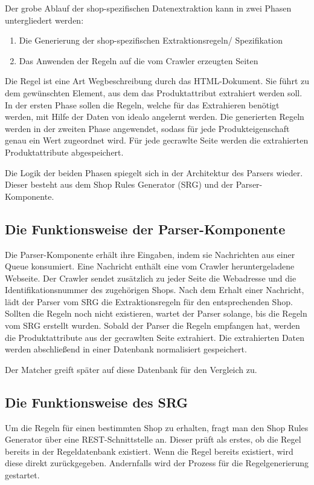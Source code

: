 Der grobe Ablauf der shop-spezifischen Datenextraktion kann in zwei Phasen untergliedert werden:
\begin{enumerate}
    \item Die Generierung der shop-spezifischen Extraktionsregeln/ Spezifikation
    \item Das Anwenden der Regeln auf die vom Crawler erzeugten Seiten
\end{enumerate}
Die Regel ist eine Art Wegbeschreibung durch das HTML-Dokument.
Sie führt zu dem gewünschten Element, aus dem das Produktattribut extrahiert werden soll.
In der ersten Phase sollen die Regeln, welche für das Extrahieren benötigt werden, mit Hilfe der Daten von idealo
angelernt werden.
Die generierten Regeln werden in der zweiten Phase angewendet, sodass für jede Produkteigenschaft genau ein Wert
zugeordnet wird.
Für jede gecrawlte Seite werden die extrahierten Produktattribute abgespeichert.

Die Logik der beiden Phasen spiegelt sich in der Architektur des Parsers wieder.
Dieser besteht aus dem Shop Rules Generator (SRG) und der Parser-Komponente.

\subsection{Die Funktionsweise der Parser-Komponente}
\label{subsec:funktionsweise-parser}

Die Parser-Komponente erhält ihre Eingaben, indem sie Nachrichten aus einer Queue konsumiert.
Eine Nachricht enthält eine vom Crawler heruntergeladene Webseite.
Der Crawler sendet zusätzlich zu jeder Seite die Webadresse und die Identifikationsnummer des zugehörigen Shops.
Nach dem Erhalt einer Nachricht, lädt der Parser vom SRG die Extraktionsregeln für den entsprechenden Shop.
Sollten die Regeln noch nicht existieren, wartet der Parser solange, bis die Regeln vom SRG erstellt wurden.
Sobald der Parser die Regeln empfangen hat, werden die Produktattribute aus der gecrawlten Seite extrahiert.
Die extrahierten Daten werden abschließend in einer Datenbank normalisiert gespeichert.

Der Matcher greift später auf diese Datenbank für den Vergleich zu.

\subsection{Die Funktionsweise des SRG}
\label{subsec:funktionsweise-srg}

Um die Regeln für einen bestimmten Shop zu erhalten, fragt man den Shop Rules Generator über eine REST-Schnittstelle an.
Dieser prüft als erstes, ob die Regel bereits in der Regeldatenbank existiert.
Wenn die Regel bereits existiert, wird diese direkt zurückgegeben.
Andernfalls wird der Prozess für die Regelgenerierung gestartet.

